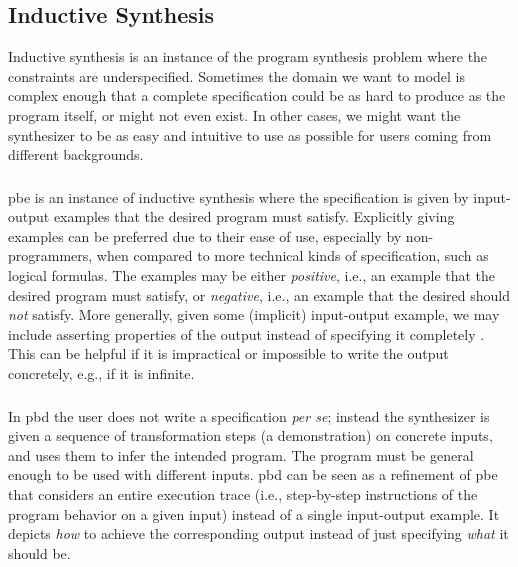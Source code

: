 \subsection{Inductive Synthesis}
\label{sec:inductive}

Inductive synthesis is an instance of the program synthesis problem where the
constraints are underspecified.
Sometimes the domain we want to model is complex enough that a complete
specification could be as hard to produce as the program itself, or might not
even exist.
In other cases, we might want the synthesizer to be as easy and intuitive to use
as possible for users coming from different backgrounds.

\subsubsection{}

\gls{pbe} is an instance of inductive synthesis where the specification is given
by input-output examples that the desired program must satisfy.
Explicitly giving examples can be preferred due to their ease of use, especially
by non-programmers, when compared to more technical kinds of specification, such
as logical formulas.
The examples may be either \textit{positive}, i.e., an example that the desired
program must satisfy, or \textit{negative}, i.e., an example that the desired
should \textit{not} satisfy.
More generally, given some (implicit) input-output example, we may include asserting
properties of the output instead of specifying it completely
\cite{Polozov:2015:FFI}.
This can be helpful if it is impractical or impossible
to write the output concretely, e.g., if it is infinite.

\subsubsection{}

In \gls{pbd} the user does not write a specification \textit{per se};
instead the synthesizer is given a sequence of transformation steps (a
demonstration) on concrete inputs, and uses them to infer the intended program.
The program must be general enough to be used with different inputs.
\gls{pbd} can be seen as a refinement of \gls{pbe} that
considers an entire execution trace (i.e., step-by-step instructions of the
program behavior on a given input) instead of a single input-output example.
It depicts \textit{how} to achieve the corresponding output instead of just
specifying \textit{what} it should be.

